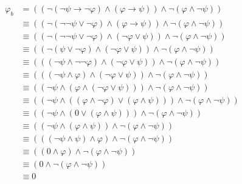\documentclass[12pt,a4paper]{scrartcl}
\begin{document}
\setcounter{equation}{-1}
\begin{align}
  \varphi_b 
    & = ((\neg (\neg \psi \rightarrow \neg \varphi) \wedge (\varphi \rightarrow \psi)) \wedge \neg(\varphi \wedge \neg \psi)) \\
    & \equiv ((\neg (\neg \neg \psi \vee \neg \varphi) \wedge (\varphi \rightarrow \psi)) \wedge \neg(\varphi \wedge \neg \psi)) \\
    & \equiv ((\neg (\neg \neg \psi \vee \neg \varphi) \wedge (\neg \varphi \vee \psi)) \wedge \neg(\varphi \wedge \neg \psi)) \\
    & \equiv ((\neg (\psi \vee \neg \varphi) \wedge (\neg \varphi \vee \psi)) \wedge \neg(\varphi \wedge \neg \psi)) \\
    & \equiv (((\neg \psi \wedge \neg \neg \varphi) \wedge (\neg \varphi \vee \psi)) \wedge \neg(\varphi \wedge \neg \psi)) \\
    & \equiv (((\neg \psi \wedge \varphi) \wedge (\neg \varphi \vee \psi)) \wedge \neg(\varphi \wedge \neg \psi)) \\
    & \equiv ((\neg \psi \wedge (\varphi \wedge (\neg \varphi \vee \psi))) \wedge \neg(\varphi \wedge \neg \psi)) \\
    & \equiv ((\neg \psi \wedge ((\varphi \wedge \neg \varphi) \vee (\varphi \wedge \psi))) \wedge \neg(\varphi \wedge \neg \psi)) \\
    & \equiv ((\neg \psi \wedge (0 \vee (\varphi \wedge \psi))) \wedge \neg(\varphi \wedge \neg \psi)) \\
    & \equiv ((\neg \psi \wedge (\varphi \wedge \psi)) \wedge \neg(\varphi \wedge \neg \psi)) \\
    & \equiv (((\neg \psi \wedge \psi) \wedge \varphi) \wedge \neg(\varphi \wedge \neg \psi)) \\
    & \equiv ((0 \wedge \varphi) \wedge \neg(\varphi \wedge \neg \psi)) \\
    & \equiv (0 \wedge \neg(\varphi \wedge \neg \psi)) \\
    & \equiv 0
\end{align}
\end{document}

